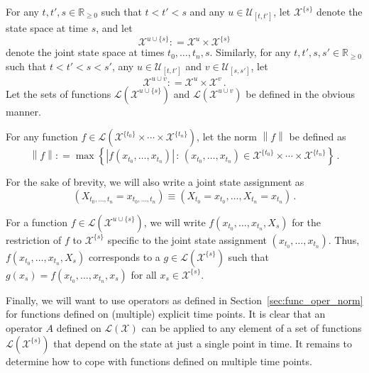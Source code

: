 \documentclass[10pt]{paper}
\theoremstyle{definition}
\newcommand{\reals}{\mathbb{R}}
\newcommand{\realsnonneg}{\reals_{\geq 0}}
\newcommand{\states}{\mathcal{X}}
\newcommand{\gambles}{\mathcal{L}}
\newcommand{\gamblesX}{\gambles(\states)}
\newcommand{\norm}[1]{\left\lVert #1 \right\rVert}
\newcommand{\abs}[1]{\left\vert #1 \right\vert}
\newcommand{\coloneqq}{:\!=}
\begin{document}
For any $t,t',s\in\realsnonneg$ such that $t<t'<s$ and any $u\in\mathcal{U}_{[t,t']}$, let $\states^{\{s\}}$ denote the state space at time $s$, and let
\begin{equation*}
\states^{u\cup\{s\}} \coloneqq \states^u\times\states^{\{s\}}
\end{equation*}
denote the joint state space at times $t_0,\ldots,t_n,s$. Similarly, for any $t,t',s,s'\in\realsnonneg$ such that $t<t'<s<s'$, any $u\in\mathcal{U}_{[t,t']}$ and $v\in\mathcal{U}_{[s,s']}$, let
\begin{equation*}
\states^{u\cup v}\coloneqq\states^u\times\states^v\,.
\end{equation*}
Let the sets of functions $\gambles(\states^{u\cup\{s\}})$ and $\gambles(\states^{u\cup v})$ be defined in the obvious manner.

For any function $f\in\gambles(\states^{\{t_0\}}\times\cdots\times\states^{\{t_n\}})$, let the norm $\norm{f}$ be defined as
\begin{equation*}
\norm{f} \coloneqq \max\left\{ \abs{f(x_{t_0},\ldots,x_{t_n})}\,:\,(x_{t_0},\ldots,x_{t_n})\in \states^{\{t_0\}}\times\cdots\times\states^{\{t_n\}}\right\}\,.
\end{equation*}

For the sake of brevity, we will also write a joint state assignment as
\begin{equation*}
\left(X_{t_0,\ldots,t_n}=x_{t_0,\ldots,t_n}\right)\equiv (X_{t_0}=x_{t_0},\ldots,X_{t_n}=x_{t_n})\,.
\end{equation*}

For a function $f\in\gambles(\states^{u\cup\{s\}})$, we will write $f(x_{t_0},\ldots,x_{t_n},X_s)$ for the restriction of $f$ to $\states^{\{s\}}$ specific to the joint state assignment $(x_{t_0},\ldots,x_{t_n})$. Thus, $f(x_{t_0},\ldots,x_{t_n},X_s)$ corresponds to a $g\in\gambles(\states^{\{s\}})$ such that $g(x_s) = f(x_{t_0},\ldots,x_{t_n},x_s)$ for all $x_s\in\states^{\{s\}}$.

Finally, we will want to use operators as defined in Section~\ref{sec:func_oper_norm} for functions defined on (multiple) explicit time points. It is clear that an operator $A$ defined on $\gamblesX$ can be applied to any element of a set of functions $\gambles(\states^{\{s\}})$ that depend on the state at just a single point in time. It remains to determine how to cope with functions defined on multiple time points. 
\end{document}
